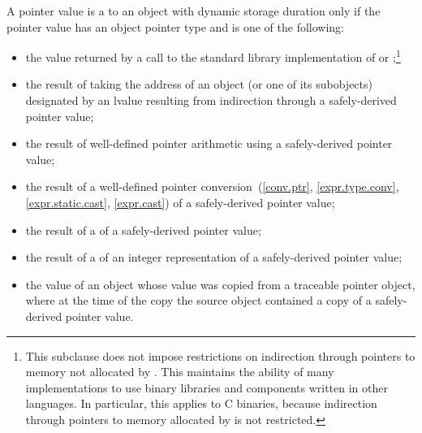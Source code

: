 \pnum
A pointer value is a  to an object with dynamic storage duration
only if the pointer value has an object pointer type
and is one of the following:
\begin{itemize}
\item the value returned by a call to the \Cpp{} standard library implementation of
 or
%
;\footnote{This subclause does not impose restrictions
on indirection through pointers to memory not allocated by . This
maintains the ability of many \Cpp{} implementations to use binary libraries and
components written in other languages. In particular, this applies to C binaries,
because indirection through pointers to memory allocated by  is not restricted.}

\item the result of taking the address of an object (or one of its
  subobjects) designated by an lvalue resulting from indirection
  through a safely-derived pointer value;

\item the result of well-defined pointer arithmetic using a safely-derived pointer
value;

\item the result of a well-defined pointer
conversion~(\ref{conv.ptr}, \ref{expr.type.conv}, \ref{expr.static.cast},
\ref{expr.cast}) of a safely-derived pointer value;

\item the result of a  of a safely-derived pointer value;

\item the result of a  of an integer representation of a
safely-derived pointer value;

\item the value of an object whose value was copied from a traceable pointer object,
where at the time of the copy the source object contained a copy of a safely-derived
pointer value.
\end{itemize}

